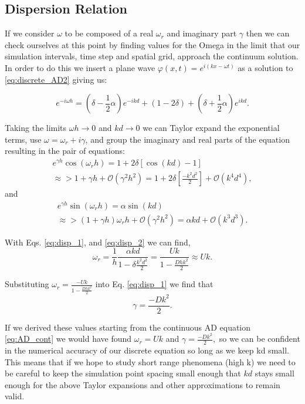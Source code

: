 \documentclass[]{article}
\begin{document}
\subsection{Dispersion Relation}
If we consider $\omega$ to be composed of a real $\omega_r$ and imaginary part $\gamma$ then we can check ourselves at this point by finding values for the Omega in the limit that our simulation intervals, time step and spatial grid, approach the continuum solution. 
In order to do this we insert a plane wave $\varphi(x,t) =e^{i(kx-\omega t)}$ as a solution to \ref{eq:discrete_AD2} giving us:

\begin{equation}
e^{-i\omega h} = (\delta-\frac{1}{2}\alpha)e^{-ikd} + (1-2\delta) +(\delta+\frac{1}{2}\alpha)e^{ikd}.
\end{equation}

Taking the limits $\omega h \to 0$ and $kd \to 0$ we can Taylor expand the exponential terms, use $\omega = \omega_r + i\gamma$, and group the imaginary and real parts of the equation resulting in the pair of equations:
\begin{gather}
\nonumber
e^{\gamma h}\cos(\omega_r h) = 1 + 2\delta \left[\cos(kd)-1\right] \\
\approx > 1+\gamma h +\mathcal{O}(\gamma^2h^2) =  1 + 2\delta \left[\frac{-k^2d^2}{2}\right] +\mathcal{O}(k^4d^4),
\label{eq:disp_1}
\end{gather}
and
\begin{gather}
\nonumber
e^{\gamma h}\sin(\omega_r h) =  \alpha \sin(kd) \\
\approx>  (1+\gamma h)\omega_r h +\mathcal{O}(\gamma^2h^2) = \alpha kd +\mathcal{O}(k^3d^3).
\label{eq:disp_2}
\end{gather}

With Eqs. \ref{eq:disp_1}, and \ref{eq:disp_2} we can find,
\begin{equation}
	\omega_r = \frac{1}{h}\frac{\alpha k d}{1-\delta \frac{k^2d^2}{2}} = \frac{Uk}{1-\frac{Dhk^2}{2}} \approx Uk.
\end{equation}

Substituting $\omega_r = \frac{-Uk}{1-\frac{Dhk^2}{2}} $ into Eq. \ref{eq:disp_1} we find that
\begin{equation}
\gamma = \frac{-Dk^2}{2}.
\end{equation}

If we derived these values starting from the continuous AD equation \ref{eq:AD_cont} we would have found $\omega_r = Uk$ and $\gamma =  \frac{-Dk^2}{2},$ so we can be confident in the numerical accuracy of our discrete equation so long as we keep kd small. This means that if we hope to study short range phenomena (high k) we need to be careful to keep the simulation point spacing small enough that $kd$ stays small enough for the above Taylor expansions and other approximations to remain valid. 
\end{document}
